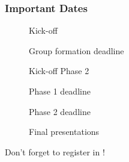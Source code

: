 \begin{frame}
  \frametitle{Important Dates}
  \begin{description}
    \item[\dateKickoffPhaseOne] Kick-off
    \item[\dateDeadlinePhaseZero] Group formation deadline
    \item[\dateKickoffPhaseTwo] Kick-off Phase 2
    \item[\dateDeadlinePhaseOne] Phase 1 deadline
    \item[\dateDeadlinePhaseTwo] Phase 2 deadline
    \item[\dateFinal] Final presentations%
  \end{description}
  \vspace{1cm}
  \pause
  \DisplayRightArrow\quad Don't forget to register in !
\end{frame}
